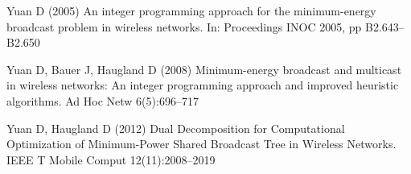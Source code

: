 \documentclass[natbib,smallextended]{svjour3}       %
\begin{document}
\begin{thebibliography}{}
Yuan D (2005)
An integer programming approach for the minimum-energy broadcast problem in wireless networks.
In: Proceedings INOC 2005, pp B2.643–B2.650

Yuan D, Bauer J, Haugland D (2008)
Minimum-energy broadcast and multicast in wireless networks: An
integer programming approach and improved heuristic algorithms.
Ad Hoc Netw
6(5):696–717

Yuan D, Haugland D (2012)
Dual Decomposition for Computational Optimization of Minimum-Power Shared Broadcast Tree in Wireless Networks.
IEEE T Mobile Comput
12(11):2008--2019

\end{thebibliography}
\end{document}
